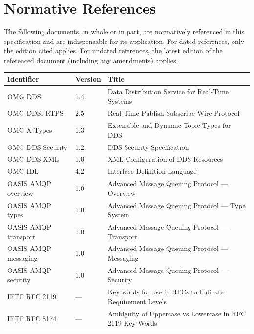 \documentclass{../styles/zerodds-vendor-spec}
\begin{document}
\chapter{Normative References}

The following documents, in whole or in part, are normatively
referenced in this specification and are indispensable for its
application. For dated references, only the edition cited applies.
For undated references, the latest edition of the referenced
document (including any amendments) applies.

\begin{longtable}{p{3.2cm}p{2.0cm}p{8.5cm}}
  \toprule
  \textbf{Identifier} & \textbf{Version} & \textbf{Title} \\
  \midrule
  \endhead
  OMG DDS              & 1.4         & Data Distribution Service for Real-Time Systems\\
  OMG DDSI-RTPS        & 2.5         & Real-Time Publish-Subscribe Wire Protocol\\
  OMG X-Types          & 1.3         & Extensible and Dynamic Topic Types for DDS\\
  OMG DDS-Security     & 1.2         & DDS Security Specification\\
  OMG DDS-XML          & 1.0         & XML Configuration of DDS Resources\\
  OMG IDL              & 4.2         & Interface Definition Language\\
  OASIS AMQP overview  & 1.0         & Advanced Message Queuing Protocol --- Overview\\
  OASIS AMQP types     & 1.0         & Advanced Message Queuing Protocol --- Type System\\
  OASIS AMQP transport & 1.0         & Advanced Message Queuing Protocol --- Transport\\
  OASIS AMQP messaging & 1.0         & Advanced Message Queuing Protocol --- Messaging\\
  OASIS AMQP security  & 1.0         & Advanced Message Queuing Protocol --- Security\\
  IETF RFC 2119        & ---         & Key words for use in RFCs to Indicate Requirement Levels\\
  IETF RFC 8174        & ---         & Ambiguity of Uppercase vs Lowercase in RFC 2119 Key Words\\

\end{longtable}
\end{document}
